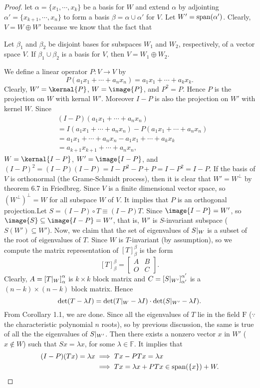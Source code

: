 \begin{proof}
	let $\alpha = \{x_1,\cdots,x_k\}$ be a basis for $W$ and extend $\alpha$ by adjointing $\alpha' = \{x_{k+1},\cdots,x_n\}$ to form a basis $\beta = \alpha \cup \alpha'$ for $V$. Let $W' = \text{span($\alpha'$)}$. Clearly, $V = W \oplus W'$ because we know that the fact that 
	\begin{tcolorbox}
		Let $\beta_1$ and $\beta_2$ be disjoint bases for subspaces $W_1$ and $W_2$, respectively, of a vector space $V$. If $\beta_1 \cup \beta_2$ is a basis for $V$, then $V = W_1 \oplus W_2$.
	\end{tcolorbox}	
	We define a linear operator $P:V \rightarrow V$ by	
	$$P(a_1x_1+\cdots+a_nx_n) = a_1x_1 + \cdots + a_kx_k.$$
	Clearly, $W' = \kernal{P}$, $W = \image{P}$, and $P^2 = P$. Hence $P$ is the projection on $W$ with kernal $W'$. Moreover $I - P$ is also the projection on $W'$ with kernel $W$. Since 
	\begin{align*}
		& (I-P)(a_1x_1+\cdots+a_nx_n) \\
		& = I(a_1x_1+\cdots+a_nx_n)-P(a_1x_1+\cdots+a_nx_n)\\
		& = a_1x_1+\cdots+a_nx_n-a_1x_1+\cdots+a_kx_k \\
		& = a_{k+1}x_{k+1} + \cdots + a_nx_n,
	\end{align*}
	 $W = \kernal{I - P}$, $W' = \image{I - P}$, and $(I - P)^2 = (I-P)(I-P) = I-P^2 - P + P = I-P^2 = I - P $. If the basis of $V$ is orthonormal (the Grame-Schmidt process), then it is clear that $W' = W^\perp$ by theorem 6.7 in Friedbreg. Since $V$ is a finite dimensional vector space, so $(W^\perp)^\perp = W$ for all subspace $W$ of $V$. It implies that $P$ is an orthogonal projection.Let $S = (I-P)\circ T \equiv (I-P)T $. Since $\image{I-P}= W'$, so $\image{S} \subseteq \image{I-P} = W'$, that is, $W'$ is $S$-invariant subspace ($S(W') \subseteq W'$). Now, we claim that the set of eigenvalues of $S\arrowvert_W$ is a subset of the root of eigenvalues of $T$. Since $W$ is $T$-invariant (by assumption), so we compute the matrix representation of $[T]^{\beta}_{\beta}$ is the form
	 $$[T]^{\beta}_{\beta} = \left[ 
	 \begin{matrix}
	 	A&B\\O&C
	 \end{matrix}
 	\right].$$
	Clearly, $A = \left[T\arrowvert_W\right]^{\alpha}_{\alpha}$ is $k \times k$ block matrix and $C = \left[ S\arrowvert_{W'}\right]^{\alpha'}_{\alpha'}$ is a $(n-k) \times (n-k)$ block matrix. Hence 
	$$\det(T - \lambda I) = \det(T\arrowvert_W - \lambda I)\cdot \det(S\arrowvert_{W'} - \lambda I).$$
	From Corollary 1.1, we are done. Since all the eigenvalues of $T$ lie in the field $\mathrm F$ ($\because$ the characteristic polynomial $n$ roots), so by previous discussion, the same is true of all the the eigenvalues of $S\arrowvert_{W'}$. Then there exists a nonzero vector $x$ in $W'$ ($x \notin W$) such that $Sx = \lambda x$, for some $\lambda \in \mathbb F$. It implies that 
	\begin{align*}
		(I-P)(Tx) = \lambda x 
	 	& \implies Tx - PTx = \lambda x \\
	 	& \implies Tx = \lambda x + PTx \in \text{span($\{x\}$)}+W.
	\end{align*}
	

\end{proof}
